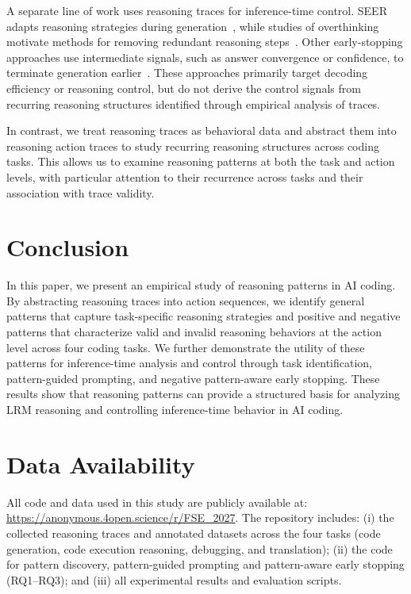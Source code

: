 \documentclass[acmsmall,screen,review,anonymous]{acmart}
\begin{document}
A separate line of work uses reasoning traces for inference-time control. SEER adapts reasoning strategies during generation~\cite{seer2025}, while studies of overthinking motivate methods for removing redundant reasoning steps~\cite{overthinking2025,asap2025,adaptivecot2025}. Other early-stopping approaches use intermediate signals, such as answer convergence or confidence, to terminate generation earlier~\cite{answerconvergence2025,deer2026}. These approaches primarily target decoding efficiency or reasoning control, but do not derive the control signals from recurring reasoning structures identified through empirical analysis of traces.

In contrast, we treat reasoning traces as behavioral data and abstract them into reasoning action traces to study recurring reasoning structures across coding tasks. This allows us to examine reasoning patterns at both the task and action levels, with particular attention to their recurrence across tasks and their association with trace validity.

\section{Conclusion}
In this paper, we present an empirical study of reasoning patterns in AI coding. By abstracting reasoning traces into action sequences, we identify general patterns that capture task-specific reasoning strategies and positive and negative patterns that characterize valid and invalid reasoning behaviors at the action level across four coding tasks. We further demonstrate the utility of these patterns for inference-time analysis and control through task identification, pattern-guided prompting, and negative pattern-aware early stopping. These results show that reasoning patterns can provide a structured basis for analyzing LRM reasoning and controlling inference-time behavior in AI coding.

\section*{Data Availability}

All code and data used in this study are publicly available at: \url{https://anonymous.4open.science/r/FSE_2027}. The repository includes: (i) the collected reasoning traces and annotated datasets across the four tasks (code generation, code execution reasoning, debugging, and translation); (ii) the code for  pattern discovery, pattern-guided prompting and pattern-aware early stopping (RQ1--RQ3); and (iii) all experimental results and evaluation scripts.



\end{document}
